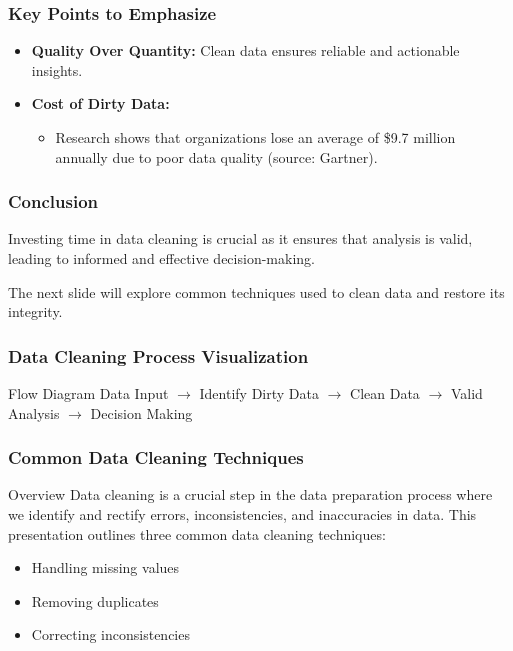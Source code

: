 \documentclass{beamer}
\begin{document}
\begin{frame}[fragile]
    \frametitle{Key Points to Emphasize}
    \begin{itemize}
        \item \textbf{Quality Over Quantity:} Clean data ensures reliable and actionable insights.
        \item \textbf{Cost of Dirty Data:} 
        \begin{itemize}
            \item Research shows that organizations lose an average of \$9.7 million annually due to poor data quality (source: Gartner).
        \end{itemize}
    \end{itemize}
\end{frame}

\begin{frame}[fragile]
    \frametitle{Conclusion}
    Investing time in data cleaning is crucial as it ensures that analysis is valid, leading to informed and effective decision-making. 

    The next slide will explore common techniques used to clean data and restore its integrity.
\end{frame}

\begin{frame}[fragile]
    \frametitle{Data Cleaning Process Visualization}
    \begin{block}{Flow Diagram}
        Data Input $\to$ Identify Dirty Data $\to$ Clean Data $\to$ Valid Analysis $\to$ Decision Making
    \end{block}
\end{frame}

\begin{frame}
    \frametitle{Common Data Cleaning Techniques}
    \begin{block}{Overview}
        Data cleaning is a crucial step in the data preparation process where we identify and rectify errors, inconsistencies, and inaccuracies in data. This presentation outlines three common data cleaning techniques:
        \begin{itemize}
            \item Handling missing values
            \item Removing duplicates
            \item Correcting inconsistencies
        \end{itemize}
    \end{block}
\end{frame}
\end{document}

